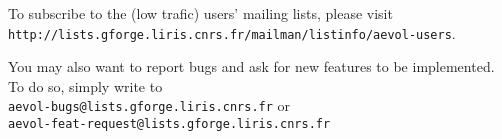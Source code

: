 To subscribe to the (low trafic) users' mailing lists, please visit \\\verb?http://lists.gforge.liris.cnrs.fr/mailman/listinfo/aevol-users?.

You may also want to report bugs and ask for new features to be implemented. \\To do so, simply write to \\\verb?aevol-bugs@lists.gforge.liris.cnrs.fr? or \\\verb?aevol-feat-request@lists.gforge.liris.cnrs.fr?


\clearemptydoublepage






